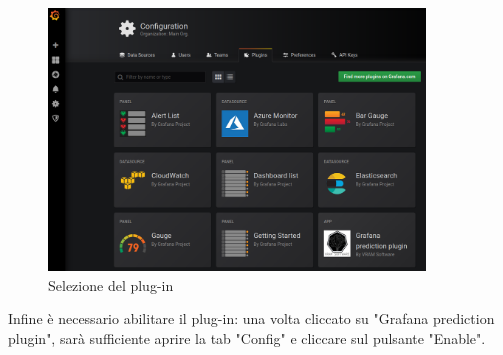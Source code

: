 \begin{figure}[H] 	
	\begin{center}
		\includegraphics[width=10cm]{img/inserimento-plugin2.png}
	\end{center}
	\caption{Selezione del plug-in}	
\end{figure}


Infine è necessario abilitare il plug-in: una volta cliccato su "Grafana prediction plugin", sarà sufficiente aprire la tab "Config" e cliccare sul pulsante "Enable".

